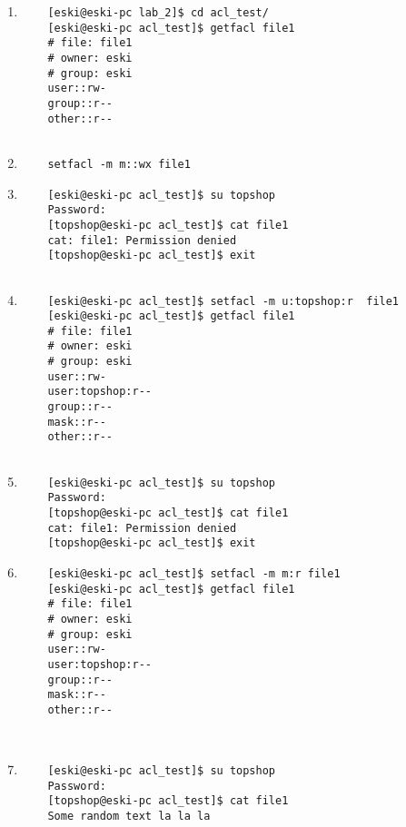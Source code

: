 \documentclass{article}
\begin{document}
\begin{enumerate}
\begin{verbatim}
	\end{verbatim}
	\item \begin{verbatim}
	[eski@eski-pc lab_2]$ cd acl_test/
	[eski@eski-pc acl_test]$ getfacl file1
	# file: file1
	# owner: eski
	# group: eski
	user::rw-
	group::r--
	other::r--
	
	\end{verbatim}
	\item \begin{verbatim}
	setfacl -m m::wx file1
	\end{verbatim}
	\item \begin{verbatim}
	[eski@eski-pc acl_test]$ su topshop 
	Password: 
	[topshop@eski-pc acl_test]$ cat file1
	cat: file1: Permission denied
	[topshop@eski-pc acl_test]$ exit
	
	\end{verbatim}
	\item \begin{verbatim}
	[eski@eski-pc acl_test]$ setfacl -m u:topshop:r  file1
	[eski@eski-pc acl_test]$ getfacl file1
	# file: file1
	# owner: eski
	# group: eski
	user::rw-
	user:topshop:r--
	group::r--
	mask::r--
	other::r--
	
	\end{verbatim}
	\item \begin{verbatim}
	[eski@eski-pc acl_test]$ su topshop
	Password: 
	[topshop@eski-pc acl_test]$ cat file1
	cat: file1: Permission denied
	[topshop@eski-pc acl_test]$ exit 
	\end{verbatim}
	\item \begin{verbatim}
	[eski@eski-pc acl_test]$ setfacl -m m:r file1
	[eski@eski-pc acl_test]$ getfacl file1
	# file: file1
	# owner: eski
	# group: eski
	user::rw-
	user:topshop:r--
	group::r--
	mask::r--
	other::r--
	
	
	\end{verbatim}
	\item \begin{verbatim}
	[eski@eski-pc acl_test]$ su topshop 
	Password: 
	[topshop@eski-pc acl_test]$ cat file1
	Some random text la la la
	
	\end{verbatim}
		
\end{enumerate}
	
\newpage
\Large
\end{document}
